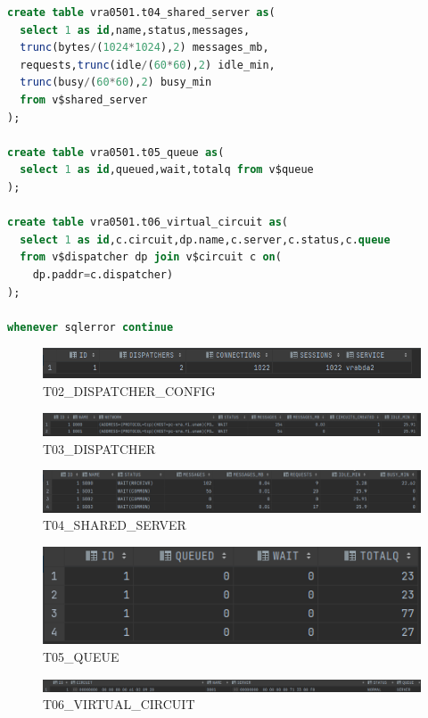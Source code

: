 \documentclass[journal]{IEEEtran}
\begin{document}
\begin{lstlisting}[language=sql, caption=s-03-consultas.sql,label={lst:codigo5}]
create table vra0501.t04_shared_server as(
  select 1 as id,name,status,messages,
  trunc(bytes/(1024*1024),2) messages_mb, 
  requests,trunc(idle/(60*60),2) idle_min,
  trunc(busy/(60*60),2) busy_min
  from v$shared_server
);

create table vra0501.t05_queue as(
  select 1 as id,queued,wait,totalq from v$queue
);

create table vra0501.t06_virtual_circuit as(
  select 1 as id,c.circuit,dp.name,c.server,c.status,c.queue
  from v$dispatcher dp join v$circuit c on( 
    dp.paddr=c.dispatcher)
);

whenever sqlerror continue
\end{lstlisting}
\begin{figure}[H]
  \centering
  \includegraphics[scale=.22]{captura_2.png}
   \caption{T02\_DISPATCHER\_CONFIG}
   \label{fig:validador_2}
\end{figure}
\begin{figure}[H]
  \centering
  \includegraphics[scale=.18]{captura_3.png}
   \caption{T03\_DISPATCHER}
   \label{fig:validador_3}
\end{figure}
\begin{figure}[H]
  \centering
  \includegraphics[scale=.18]{captura_4.png}
   \caption{T04\_SHARED\_SERVER}
   \label{fig:validador_4}
\end{figure}
\begin{figure}[H]
  \centering
  \includegraphics[scale=.18]{captura_5.png}
   \caption{T05\_QUEUE}
   \label{fig:validador_5}
\end{figure}
\begin{figure}[H]
  \centering
  \includegraphics[scale=.18]{captura_6.png}
   \caption{T06\_VIRTUAL\_CIRCUIT}
   \label{fig:validador_6}
\end{figure}
\end{document}

